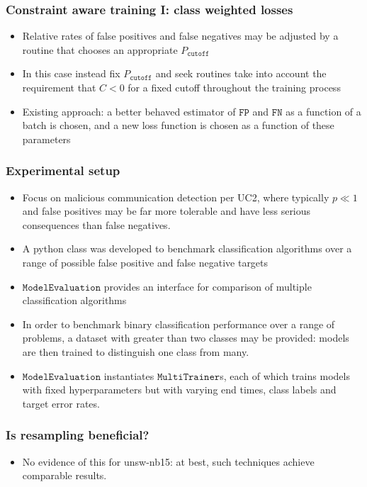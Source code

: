 \documentclass{beamer}
\newcommand{\CO}{{P_{\texttt{cutoff}}}}
\newcommand{\FP}{{\texttt{FP}}}
\newcommand{\FN}{{\texttt{FN}}}
\begin{document}
\begin{frame}
\frametitle{Constraint aware training I: class weighted losses}
\begin{itemize}
\item
  Relative rates of false positives and false negatives may be adjusted by a routine that chooses an appropriate $\CO$ 
\item
  In this case instead fix $\CO$ and seek routines take into account the requirement that $C<0$ for a fixed cutoff throughout the training process
\item
  Existing approach: a better behaved estimator of $\FP$ and $\FN$ as a function of a batch is chosen, and a new loss function is chosen as a function of these parameters
\end{itemize}
\end{frame}
\begin{frame}
\frametitle{Experimental setup}
\begin{itemize}
\item
Focus on malicious communication detection per UC2, where typically $p\ll 1$ and false positives may be far more tolerable and have less serious consequences than false negatives.
\item
A python class was developed to benchmark classification algorithms over a range of possible false positive and false negative targets
\item
$\texttt{ModelEvaluation}$ provides an interface for comparison of multiple classification algorithms
\item 
In order to benchmark binary classification performance over a range of problems, a dataset with greater than two classes may be provided: models are then trained to distinguish one class from many.
\item
$\texttt{ModelEvaluation}$ instantiates $\texttt{MultiTrainer}$s, each of which trains models with fixed hyperparameters but with varying end times, class labels and target error rates.
\end{itemize}
\end{frame}
\begin{frame}
\frametitle{Is resampling beneficial?}
\begin{itemize}
\item
No evidence of this for unsw-nb15: at best, such techniques achieve comparable results.
\end{itemize}
\end{frame}
\end{document}
